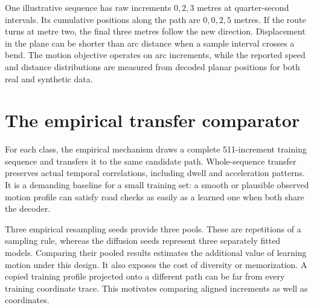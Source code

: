 

One illustrative sequence has raw increments $0,2,3$ metres at quarter-second intervals. Its cumulative positions along the path are $0,0,2,5$ metres. If the route turns at metre two, the final three metres follow the new direction. Displacement in the plane can be shorter than arc distance when a sample interval crosses a bend. The motion objective operates on arc increments, while the reported speed and distance distributions are measured from decoded planar positions for both real and synthetic data.

\section{The empirical transfer comparator}
For each class, the empirical mechanism draws a complete 511-increment training sequence and transfers it to the same candidate path. Whole-sequence transfer preserves actual temporal correlations, including dwell and acceleration patterns. It is a demanding baseline for a small training set: a smooth or plausible observed motion profile can satisfy road checks as easily as a learned one when both share the decoder.

Three empirical resampling seeds provide three pools. These are repetitions of a sampling rule, whereas the diffusion seeds represent three separately fitted models. Comparing their pooled results estimates the additional value of learning motion under this design. It also exposes the cost of diversity or memorization. A copied training profile projected onto a different path can be far from every training coordinate trace. This motivates comparing aligned increments as well as coordinates.
